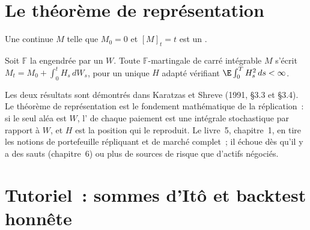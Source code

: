 \section{Le théorème de représentation}

\begin{theorem}\label{thm:qm:ito-calculus:levy}
Une  continue $M$ telle que $M_0 = 0$ et $[M]_t = t$ est un .
\end{theorem}

\admitted

\begin{theorem}\label{thm:qm:ito-calculus:representation}
Soit $\mathbb F$ la  engendrée par un  $W$. Toute
$\mathbb F$-martingale de carré intégrable $M$ s'écrit $M_t = M_0 + \int_0^tH_s\,dW_s$, pour un unique $H$ adapté vérifiant
$\E\int_0^TH_s^2\,ds < \infty$.
\end{theorem}

\admitted

Les deux résultats sont démontrés dans Karatzas et Shreve (1991, §3.3 et §3.4). Le théorème de représentation
est le fondement mathématique de la réplication~: si le seul aléa est $W$, l' de chaque paiement
est une intégrale stochastique par rapport à $W$, et $H$ est la position qui le reproduit. Le
livre~5, chapitre~1, en tire les notions de portefeuille répliquant et de marché complet~; il
échoue dès qu'il y a des sauts (chapitre~6) ou plus de sources de risque que d'actifs négociés.

\section{Tutoriel~: sommes d'Itô et backtest honnête}\label{tut:qm:ito-calculus:backtest}

